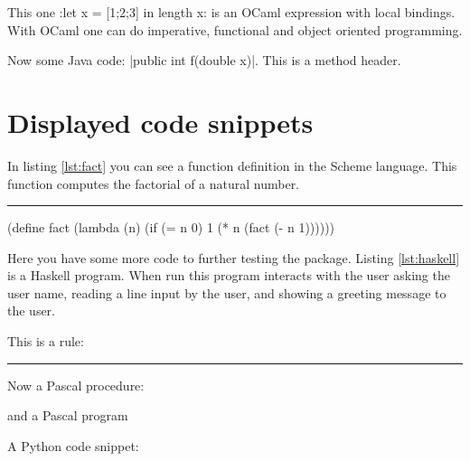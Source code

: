 \documentclass[10pt]{article}
\begin{document}

This one
\pyginline[lang=ocaml,font=\ttfamily\scriptsize,topline=false]:let x = [1;2;3] in length x:
is an OCaml expression with local bindings. With OCaml one can do
imperative, functional and object oriented programming.

Now some Java code:
\pyginline[lang=java,style=colorful,font=\ttfamily\itshape,linewidth=1pt]|public int f(double x)|.
This is a method header.

\section{Displayed code snippets}


In listing \ref{lst:fact} you can see a function definition in the
Scheme language. This function computes the factorial of a natural
number.
\newline\rule{\linewidth}{2pt}
\begin{pygmented}[
  style=emacs,
  linenos,
  label=lst:fact,
  caption=A Scheme function.
  ]
(define fact
    (lambda (n)
        (if (= n 0)
            1
            (* n (fact (- n 1))))))
\end{pygmented}

Here you have some more code to further testing the package. Listing
\ref{lst:haskell} is a Haskell program. When run this program interacts
with the user asking the user name, reading a line input by the user,
and showing a greeting message to the user.


This is a rule:

\noindent\rule{\linewidth}{2pt}

Now a Pascal procedure:

and a Pascal program

A Python code snippet:

\end{document}
